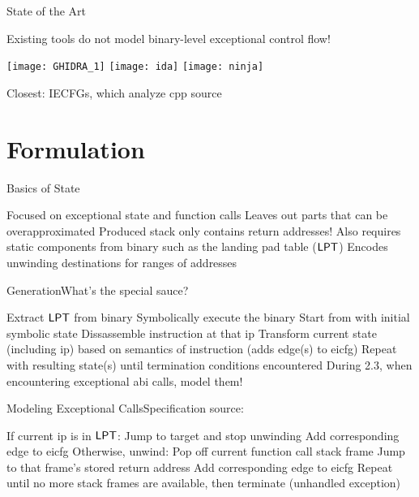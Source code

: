 \begin{frame}{State of the Art}
  \begin{outline}
    \1 Existing tools do not model binary-level exceptional control flow!
    \begin{center}
      \texttt{[image: GHIDRA\_1]}
      \hspace{1cm}
      \texttt{[image: ida]}
      \hspace{1cm}
      \texttt{[image: ninja]}
    \end{center}
    \1 Closest: IECFGs, which analyze \gls{cpp} source
  \end{outline}
\end{frame}

\section{Formulation}
\begin{frame}{Basics of State}
  \begin{outline}
    \1 Focused on \alert{exceptional state} and \alert{function calls}
    \1 Leaves out parts that can be overapproximated
      \2 Produced stack only contains return addresses!
    \1 Also requires static components from binary such as the \alert{landing pad table ($\operatorname{\mathsf{LPT}}$)}
      \2 Encodes unwinding destinations for ranges of addresses
  \end{outline}
\end{frame}

\begin{frame}{Generation}{What's the special sauce?}
  \begin{outline}[enumerate]
    \1<+-> Extract $\operatorname{\mathsf{LPT}}$ from binary
    \1<+-> \alert{Symbolically execute} the binary
      \2<+-> Start from  with initial \alert{symbolic state}
      \2<+-> Dissassemble instruction at that \gls{ip}
      \2<+-> Transform current state (including \gls{ip}) based on semantics of instruction (adds edge(s) to \gls{eicfg})
      \2<+-> Repeat with resulting state(s) until termination conditions encountered
    \1<+-> \alert{During 2.3, when encountering exceptional \gls{abi} calls, model them!}
  \end{outline}
\end{frame}

\begin{frame}{Modeling Exceptional  Calls}{Specification source: }
  \begin{block}{}
    \begin{outline}[enumerate]
      \1<+-> If current \gls{ip} is in $\operatorname{\mathsf{LPT}}$:
        \2<+-> Jump to target and stop unwinding
        \2<+-> Add corresponding edge to \gls{eicfg}
      \1<+-> Otherwise, unwind:
        \2<+-> Pop off current function call stack frame
        \2<+-> Jump to that frame's stored return address
        \2<+-> Add corresponding edge to \gls{eicfg}
      \1<+-> Repeat until no more stack frames are available, then terminate (\alert{unhandled exception})
    \end{outline}
  \end{block}
\end{frame}

